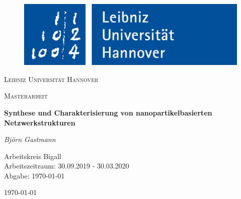 
\begin{titlepage}
\centering
\begin{figure}
\centering
\includegraphics[width=0.3\linewidth,trim=0 0 0 5]{Bilder/LUH}
\end{figure}
\vspace{1cm}
{\scshape\LARGE Leibniz Universität Hannover \par}
\vspace{1cm}
{\scshape\Large Masterarbeit\par}
\vspace{1.5cm}
{\huge\bfseries Synthese und Charakterisierung von nanopartikelbasierten Netzwerkstrukturen \par}
\vspace{2cm}
{\Large\itshape Björn Gastmann\par}
\vfill
\begin{flushleft}
Arbeitskreis Bigall\\
Arbeitszeitraum: 30.09.2019 - 30.03.2020\\
Abgabe: \today
\end{flushleft}
\vfill
	{\large \today\par}
\end{titlepage}